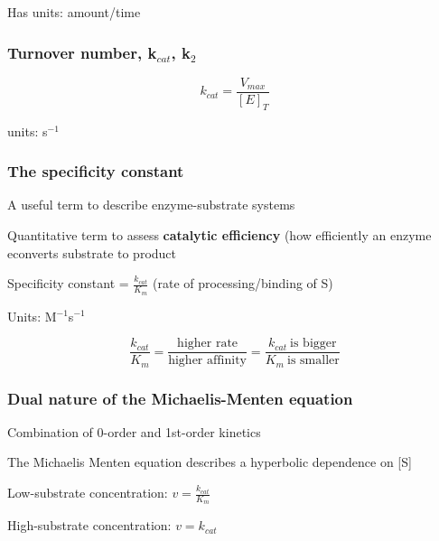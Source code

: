 \documentclass[letterpaper, 12pt]{article}
\begin{document}
Has units: amount/time

\subsubsection*{Turnover number, k$_{cat}$, k$_2$}

$$k_{cat} = \frac{V_{max}}{[E]_T}$$

units: s$^{-1}$

\subsubsection*{The specificity constant}
A useful term to describe enzyme-substrate systems

Quantitative term to assess \textbf{catalytic efficiency} (how efficiently an enzyme econverts substrate to product

Specificity constant = $\displaystyle \frac{k_{cat}}{K_m}$ (rate of processing/binding of S)

Units: M$^{-1}$s$^{-1}$

$$\frac{k_{cat}}{K_m} = \frac{\text{higher rate}}{\text{higher affinity}} = \frac{k_{cat} \: \text{is bigger}}{K_m \: \text{is smaller}}$$

\subsubsection*{Dual nature of the Michaelis-Menten equation}

Combination of 0-order and 1st-order kinetics

The Michaelis Menten equation describes a hyperbolic dependence on [S]

Low-substrate concentration: $\displaystyle v = \frac{k_{cat}}{K_m}$

High-substrate concentration: $v = k_{cat}$
\end{document}
